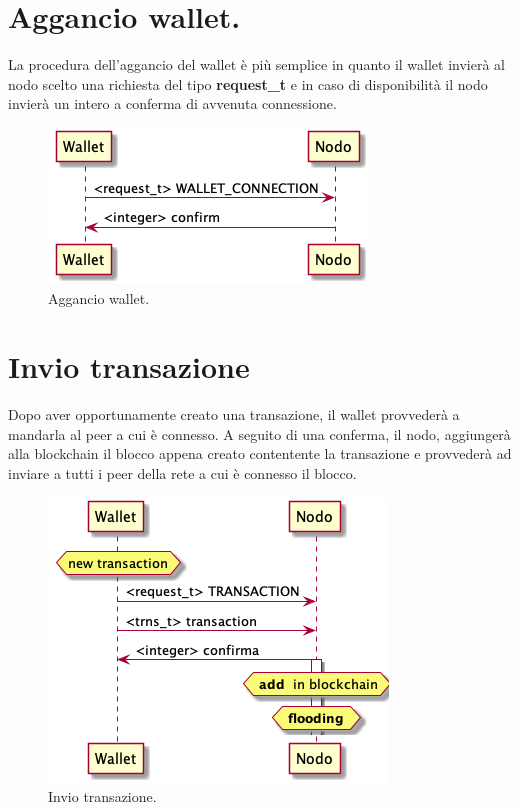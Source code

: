 \documentclass[a4paper,10pt]{report}
\begin{document}
  \section{Aggancio wallet.}
  La procedura dell'aggancio del wallet è più semplice in quanto il wallet invierà al nodo scelto una richiesta del tipo \textbf{request\_t} e in caso di disponibilità il nodo invierà un intero a conferma di avvenuta connessione.

  \begin{figure}[H]
  \center\includegraphics[scale=0.40]{hookwallet.png}
  \caption{Aggancio wallet.}
  \end{figure}

	\section{Invio transazione}
	Dopo aver opportunamente creato una transazione, il wallet provvederà a mandarla al peer a cui è connesso. A seguito di una conferma, il nodo, aggiungerà alla blockchain il blocco appena creato contentente la transazione e provvederà ad inviare a tutti i peer della rete a cui è connesso il blocco.

	\begin{figure}[H]
	\center\includegraphics[scale=0.40]{newtransaction.png}
	\caption{Invio transazione.}
	\end{figure}
\end{document}
